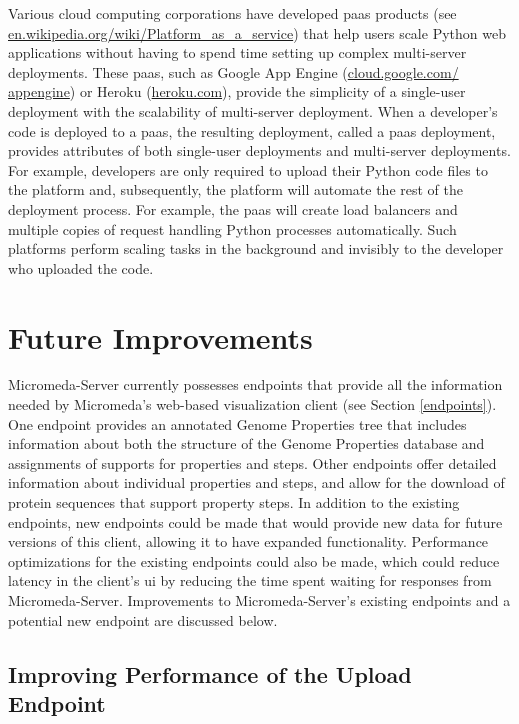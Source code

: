 Various cloud computing corporations have developed \gls{paas} 
\cite{lawton2008developing} products (see 
\href{http://en.wikipedia.org/wiki/Platform_as_a_service}{en.wikipedia.org/wiki/Platform\_as\_a\_service}) 
that help users scale Python web applications without having to spend time 
setting up complex multi-server deployments. These \gls{paas}, such as Google 
App Engine (\href{http://cloud.google.com/appengine}{cloud.google.com/ 
appengine}) or Heroku (\href{http://heroku.com}{heroku.com}), provide the 
simplicity of a single-user deployment with the scalability of multi-server 
deployment. When a developer's code is deployed to a \gls{paas}, the resulting 
deployment, called a \gls{paas} deployment, provides attributes of both 
single-user deployments and multi-server deployments. For example, developers 
are only required to upload their Python code files to the platform and, 
subsequently, the platform will automate the rest of the deployment process. For 
example, the \gls{paas} will create load balancers and multiple copies of 
request handling Python processes automatically. Such platforms perform scaling 
tasks in the background and invisibly to the developer who uploaded the code.

\FloatBarrier
\section{Future Improvements} \label{micromeda-server-improvements}

Micromeda-Server currently possesses endpoints that provide all the information 
needed by Micromeda’s web-based visualization client (see Section 
\ref{endpoints}). One endpoint provides an annotated Genome Properties tree that 
includes information about both the structure of the Genome Properties database 
and assignments of supports for properties and steps. Other endpoints offer 
detailed information about individual properties and steps, and allow for the 
download of protein sequences that support property steps. In addition to the 
existing endpoints, new endpoints could be made that would provide new data for 
future versions of this client, allowing it to have expanded functionality. 
Performance optimizations for the existing endpoints could also be made, which 
could reduce latency in the client’s \gls{ui} by reducing the time spent waiting 
for responses from Micromeda-Server. Improvements to Micromeda-Server’s existing 
endpoints and a potential new endpoint are discussed below.

\subsection{Improving Performance of the Upload Endpoint}

